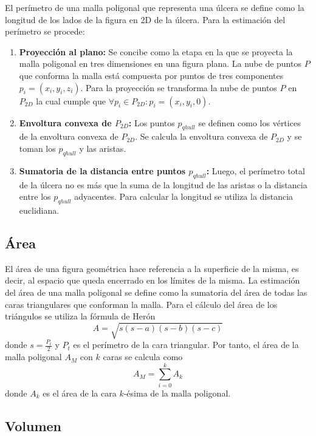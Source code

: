 El perímetro de una malla poligonal que representa una úlcera se define como la longitud de los lados de la figura en 2D de la úlcera. Para la estimación del perímetro se procede:

\begin{enumerate}
	\item \textbf{Proyección al plano:} Se concibe como la etapa en la que se proyecta la malla poligonal en tres dimensiones en una figura plana. La nube de puntos $P$ que conforma la malla está compuesta por puntos de tres componentes $p_i = (x_i, y_i, z_i)$. Para la proyección se transforma la nube de puntos $P$ en $P_{2D}$ la cual cumple que $\forall p_i \in P_{2D}: p_i = (x_i, y_i, 0)$.
	
	\item \textbf{Envoltura convexa de $P_{2D}$:} Los puntos $p_{qhull}$ se definen como los vértices de la envoltura convexa de $P_{2D}$. Se calcula la envoltura convexa de $P_{2D}$ y se toman los $p_{qhull}$ y las aristas.
	
	\item \textbf{Sumatoria de la distancia entre puntos $p_{qhull}$:} Luego, el perímetro total de la úlcera no es más que la suma de la longitud de las aristas o la distancia entre los $p_{qhull}$ adyacentes. Para calcular la longitud se utiliza la distancia euclidiana.
	
\end{enumerate}

\subsection{Área}

El área de una figura geométrica hace referencia a la superficie de la misma, es decir, al espacio que queda encerrado en los límites de la misma. La estimación del área de una malla poligonal se define como la sumatoria del área de todas las caras triangulares que conforman la malla. Para el cálculo del área de los triángulos se utiliza la fórmula de Herón 
$$A = \sqrt{s(s-a)(s-b)(s-c)}$$
donde $s = \frac{P_t}{2}$ y $P_t$ es el perímetro de la cara triangular. Por tanto, el área de la malla poligonal $A_M$ con $k$ caras se calcula como
\begin{equation}
	A_M = \sum_{i = 0}^{k} A_k
\end{equation}
donde $A_k$ es el área de la cara $k$-ésima de la malla poligonal.

\subsection{Volumen}


